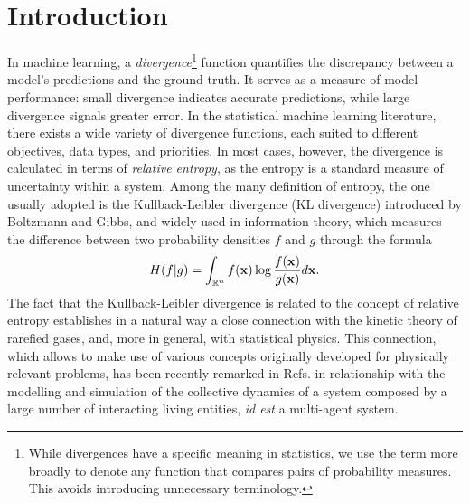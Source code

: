 \documentclass{article}
\def\bx{{\bf x}}
\def \erre{\mathbb{R}}
\begin{document}
\section{Introduction}
% 
In machine learning, a \emph{divergence}\footnote{While divergences have a specific meaning in statistics, we use the term more broadly to denote any function that compares pairs of probability measures. This avoids introducing unnecessary terminology.} function quantifies the discrepancy between a model's predictions and the ground truth. 
% 
It serves as a measure of model performance: small divergence indicates accurate predictions, while large divergence signals greater error.
% 
% 
In the statistical machine learning literature, there exists a wide variety of divergence functions, each suited to different objectives, data types, and priorities. 
% 
In most cases, however, the divergence is calculated in terms of \emph{relative entropy}, as the entropy is a standard measure of uncertainty within a system. 
% 
Among the many definition of entropy, the one usually adopted is the Kullback-Leibler divergence (KL divergence) introduced by Boltzmann and Gibbs, and widely used in information theory,\cite{KL} which measures the difference between two probability densities $f$ and $g$ through the formula
\[
    H(f|g) = \int_{\erre^n} f(\bx)\log\frac{f(\bx)}{g(\bx)}d\bx.
\]
The fact that the Kullback-Leibler divergence is related to the concept of relative entropy establishes in a natural way a close connection with the kinetic theory of rarefied gases, and, more in general, with statistical physics.
% 
This connection, which allows to make use of various concepts originally developed for physically relevant problems, has been recently remarked in Refs. \cite{BDL,BE} in relationship with the modelling and simulation of the collective dynamics of a system composed by a large number of interacting living entities, \textit{id est} a multi-agent system.
\end{document}
